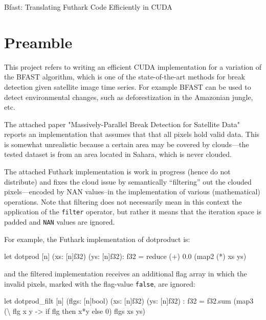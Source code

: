 \documentclass[a4paper,11pt]{article}
\begin{document}

\begin{center}

{\LARGE Bfast: Translating Futhark Code Efficiently in CUDA}

\end{center}

\section*{Preamble}

This project refers to writing an efficient CUDA implementation
for a variation of the BFAST algorithm, which is one of the
state-of-the-art methods for break detection given satellite image
time series. For example BFAST can be used to detect environmental
changes, such as deforestization in the Amazonian jungle, etc.

The attached paper "Massively-Parallel Break Detection 
for Satellite Data" reports an implementation that assumes that
that all pixels hold valid data. This is somewhat unrealistic
because a certain area may be covered by clouds---the tested 
dataset is from an area located in Sahara, which is never clouded.

The attached
Futhark implementation is work in progress (hence do not distribute) 
and fixes the cloud issue by semantically ``filtering'' out the 
clouded pixels---encoded by NAN values--in the implementation of
various (mathematical) operations. Note that filtering does not
necessarily mean in this context the application of the {\tt filter} 
operator, but rather it means that the iteration space is padded
and {\tt NAN} values are ignored.

For example, the Futhark implementation of dotproduct is:

\begin{fancycode}
let dotprod [n] (xs: [n]f32) (ys: [n]f32): f32 =
    reduce (+) 0.0 (map2 (*) xs ys) 
\end{fancycode}

and the filtered implementation receives an additional flag array
in which the invalid pixels, marked with the flag-value {\tt false},
are ignored:

\begin{fancycode}
let dotprod_filt [n] (flgs: [n]bool) (xs: [n]f32) (ys: [n]f32) : f32 =
    f32.sum (map3 (\textbackslash{} flg x y -> if flg then x*y else 0) flgs xs ys)
\end{fancycode}
\end{document}
